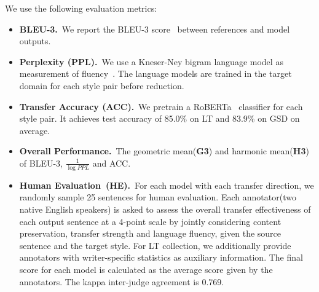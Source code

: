 We use the following evaluation metrics:
\begin{itemize}
	\setlength{\itemsep}{0pt}
	\setlength{\parsep}{0pt}
	\setlength{\parskip}{0pt}
	\item \textbf{BLEU-3.}~We report the BLEU-3 score~\citep{papineni2002bleu} between references and model outputs. 
	\item \textbf{Perplexity (PPL).}~We use a Kneser-Ney bigram language model as measurement of fluency~\citep{kneser1995improved}. The language models are trained in the target domain for each style pair before reduction.
	\item \textbf{Transfer Accuracy (ACC).}~We pretrain a RoBERTa~\citep{liu2019roberta} classifier for each style pair. It achieves test accuracy of 85.0\% on LT and 83.9\% on GSD on average.
	\item \textbf{Overall Performance.}~The geometric mean(\textbf{G3}) and harmonic mean(\textbf{H3}) of BLEU-3, $\frac{1}{\log{PPL}}$ and ACC.
	\item \textbf{Human Evaluation~(HE).}~For each model with each transfer direction, we randomly sample 25 sentences for human evaluation. Each annotator(two native English speakers) is asked to assess the overall transfer effectiveness of each output sentence at a 4-point scale by jointly considering content preservation, transfer strength and language fluency, given the source sentence and the target style. For LT collection, we additionally provide annotators with writer-specific statistics as auxiliary information.
	The final score for each model is calculated as the average score given by the annotators. The kappa inter-judge agreement is 0.769.
\end{itemize}






